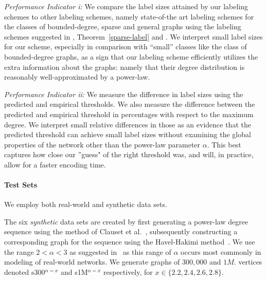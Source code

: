 \emph{Performance Indicator i:} We  compare the label sizes attained by our labeling schemes to other labeling schemes, namely state-of-the art labeling schemes for the classes of bounded-degree, sparse and general graphs using the  labeling schemes suggested in \cite{adjiashvili2014labeling},  Theorem~\ref{sparse-label} and \cite{alstrup2014adjacency}.  We interpret small label sizes for our scheme, especially in comparison with ``small'' classes like the class of bounded-degree graphs, as a sign that our labeling scheme efficiently utilizes  the extra information about the graphs: namely that their degree distribution is reasonably well-approximated by a power-law.

\emph{Performance Indicator ii:} We measure the difference in label sizes using the predicted and empirical thresholds. 
 We also measure  the difference between the predicted and empirical threshold in percentages with respect to the maximum degree.
We interpret  small relative differences in those as an evidence  that the predicted threshold can achieve small label sizes without examining the global properties of the network other than the power-law parameter $\alpha$. 
This best captures how close our ''guess" of the right threshold was, and will, in practice, allow for a faster encoding time.
 




 

\paragraph{Test Sets}
We employ both real-world and synthetic data sets. 

The six \emph{synthetic} data sets are created by first generating a power-law degree sequence using the method of Clauset et al.~\cite[App.\ D]{clauset2009power}, subsequently constructing a corresponding graph for the sequence using the Havel-Hakimi method~\cite{hakimi1962realizability}. 
We use the range $2< \alpha < 3$ as suggested in~\cite{clauset2009power} as this range of $\alpha$ occurs most commonly in modeling of real-world networks. We generate graphs of $300,000$ and $1M.$ vertices denoted  s300$^{\alpha=x}$  and s1M$^{\alpha=x}$  respectively, for $x \in \{2.2,2.4,2.6,2.8\}$. 


